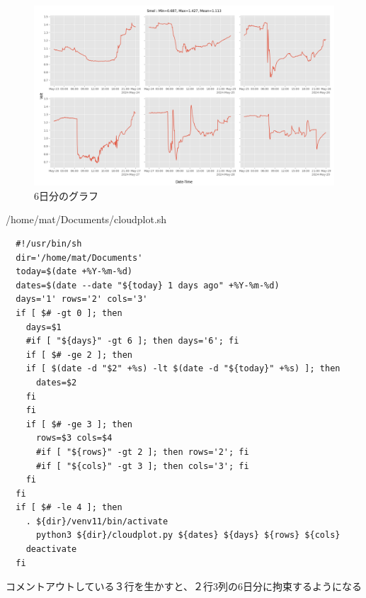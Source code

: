 \documentclass[12pt,a4j]{jsbook}
\begin{document}
\begin{figure}[htbp]
	\begin{minipage}[b]{1.0\linewidth}
		\centering
		\includegraphics[keepaspectratio, scale=0.37]{figs/png/savefig.png}
		\caption{6日分のグラフ}
	\end{minipage}
\end{figure}

\begin{spacing}{0.95}
\begin{itembox}[l]{/home/mat/Documents/cloudplot.sh}
\begin{verbatim}
  #!/usr/bin/sh
  dir='/home/mat/Documents'
  today=$(date +%Y-%m-%d)
  dates=$(date --date "${today} 1 days ago" +%Y-%m-%d)
  days='1' rows='2' cols='3'
  if [ $# -gt 0 ]; then
    days=$1
    #if [ "${days}" -gt 6 ]; then days='6'; fi
    if [ $# -ge 2 ]; then
    if [ $(date -d "$2" +%s) -lt $(date -d "${today}" +%s) ]; then
      dates=$2
    fi
    fi
    if [ $# -ge 3 ]; then
      rows=$3 cols=$4
      #if [ "${rows}" -gt 2 ]; then rows='2'; fi
      #if [ "${cols}" -gt 3 ]; then cols='3'; fi
    fi
  fi
  if [ $# -le 4 ]; then
    . ${dir}/venv11/bin/activate
      python3 ${dir}/cloudplot.py ${dates} ${days} ${rows} ${cols}
    deactivate
  fi
\end{verbatim}
\end{itembox}
\end{spacing}

コメントアウトしている３行を生かすと、２行3列の6日分に拘束するようになる\\
\end{document}
